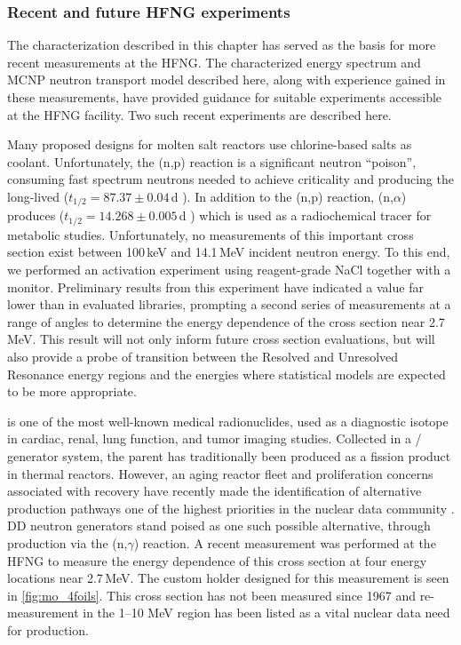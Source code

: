 \subsubsection{Recent and future HFNG experiments}



The characterization described in this chapter has  served as the basis for more recent measurements at the HFNG.
The characterized energy spectrum and MCNP neutron transport model described here, along with experience gained in these measurements, have provided guidance for suitable experiments accessible at the HFNG facility.
Two such recent experiments are described here.




Many proposed designs for molten salt reactors use chlorine-based salts as coolant. 
Unfortunately, the (n,p) reaction is a significant neutron \enquote{poison}, consuming fast spectrum neutrons needed to achieve criticality and producing the long-lived  ($t_{1/2}=87.37\pm0.04$\,d \cite{Chen2011}). 
In addition to the (n,p) reaction, (n,$\alpha$) produces   ($t_{1/2}=14.268\pm0.005$\,d \cite{Ouellet2011}) which is used as a radiochemical tracer for metabolic studies. 
Unfortunately, no measurements  of this important cross section exist between 100\,keV and 14.1\,MeV incident neutron energy.
To this end, we performed an activation experiment using reagent-grade NaCl together with a  monitor. 
Preliminary results from this experiment have indicated a value far lower than in evaluated libraries, prompting a
second series of measurements at a range of angles to determine the energy dependence of the cross section near 2.7\,MeV. This result will not only inform future  cross section evaluations, but will also provide a probe of transition
between the Resolved and Unresolved Resonance energy regions and the energies where statistical models are expected to be more appropriate.



 is one of the most well-known medical radionuclides, used as a diagnostic isotope in cardiac, renal, lung function, and tumor imaging studies.
Collected in a / generator system, the  parent has traditionally been produced as a fission product in thermal reactors.
However, an aging reactor fleet and proliferation concerns associated with  recovery have recently made the identification of alternative production pathways one of the highest priorities in the nuclear data community \cite{bernstein2015nuclear}.
DD neutron generators stand poised as one such possible alternative, through production via the (n,$\gamma$) reaction.
A recent measurement was performed at the HFNG to measure  the energy dependence of this cross section  at four energy locations near 2.7\,MeV.
The custom holder designed for this measurement  is seen in \autoref{fig:mo_4foils}.
This cross section has not been measured since 1967 \cite{Stupegia1968}  and re-measurement  in the 1--10 MeV region has been  listed as a vital nuclear data need  for    production.


